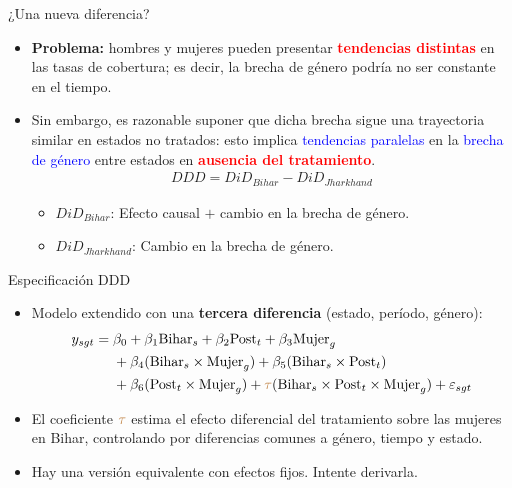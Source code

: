 \documentclass[10pt, xcolor=dvipsnames]{beamer}
\begin{document}
\begin{frame}{¿Una nueva diferencia?}
\begin{itemize}\setlength{\itemsep}{1.0em}
	\item \textbf{Problema:} hombres y mujeres pueden presentar \textcolor{red}{\textbf{tendencias distintas}} en las tasas de cobertura; es decir, la brecha de género podría no ser constante en el tiempo.
	\item Sin embargo, es razonable suponer que dicha brecha sigue una trayectoria similar en estados no tratados: esto implica \textcolor{blue}{tendencias paralelas} en la \textcolor{blue}{brecha de género} entre estados en \textcolor{red}{\textbf{ausencia del tratamiento}}.
	\begin{align*}
	DDD = DiD_{Bihar} - DiD_{Jharkhand}
	\end{align*}
    \vspace{-1em}
        \begin{itemize}
    	\item $DiD_{Bihar}$: Efecto causal $+$ cambio en la brecha de género.
    	\item $DiD_{Jharkhand}$: Cambio en la brecha de género.
        \end{itemize}    
\end{itemize}	
\end{frame}


\begin{frame}{Especificación DDD}
\begin{itemize}\setlength{\itemsep}{1.0em}   
    \item Modelo extendido con una \textbf{tercera diferencia} (estado, período, género):
    \begin{align*}
    \begin{split}
    y_{sgt} =\; & \beta_0 + \beta_1 \text{Bihar}_s + \beta_2 \text{Post}_t + \beta_3 \text{Mujer}_g \\
    & + \beta_4 (\text{Bihar}_s \times \text{Mujer}_g) + \beta_5 (\text{Bihar}_s \times \text{Post}_t) \\
    & + \beta_6 (\text{Post}_t \times \text{Mujer}_g) + \textcolor{brown}{\tau} (\text{Bihar}_s \times \text{Post}_t \times \text{Mujer}_g) + \varepsilon_{sgt}
    \end{split}
    \end{align*}
    \item El coeficiente \(\textcolor{brown}{\tau}\) estima el efecto diferencial del tratamiento sobre las mujeres en Bihar, controlando por diferencias comunes a género, tiempo y estado.
    \item Hay una versión equivalente con efectos fijos. Intente derivarla.
\end{itemize}
\end{frame}
\end{document}
